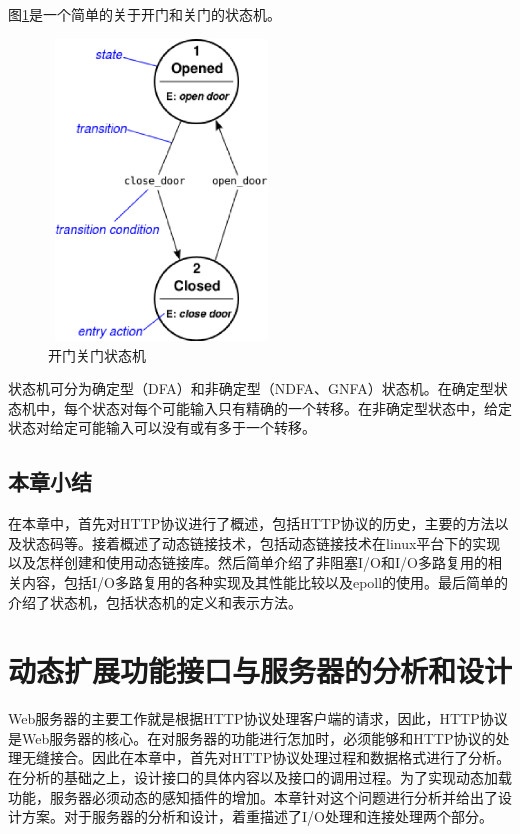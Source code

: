 \documentclass[twoside, xetex]{report}
\begin{document}
	图\ref{fsm}是一个简单的关于开门和关门的状态机。
	
	\begin{figure}[htbp]
	\centering
	\includegraphics[height=8cm, width=6cm]{pics/fsm.eps}
	\caption{开门关门状态机}
	\label{fsm}
	\end{figure}
	
	状态机可分为确定型（DFA）和非确定型（NDFA、GNFA）状态机。在确定型状态机中，每个状态对每个可能输入只有精确的一个转移。在非确定型状态中，给定状态对给定可能输入可以没有或有多于一个转移。
	
\section{本章小结}
	在本章中，首先对HTTP协议进行了概述，包括HTTP协议的历史，主要的方法以及状态码等。接着概述了动态链接技术，包括动态链接技术在linux平台下的实现以及怎样创建和使用动态链接库。然后简单介绍了非阻塞I/O和I/O多路复用的相关内容，包括I/O多路复用的各种实现及其性能比较以及epoll的使用。最后简单的介绍了状态机，包括状态机的定义和表示方法。
	
\chapter{动态扩展功能接口与服务器的分析和设计}
	
	Web服务器的主要工作就是根据HTTP协议处理客户端的请求，因此，HTTP协议是Web服务器的核心。在对服务器的功能进行怎加时，必须能够和HTTP协议的处理无缝接合。因此在本章中，首先对HTTP协议处理过程和数据格式进行了分析。在分析的基础之上，设计接口的具体内容以及接口的调用过程。为了实现动态加载功能，服务器必须动态的感知插件的增加。本章针对这个问题进行分析并给出了设计方案。对于服务器的分析和设计，着重描述了I/O处理和连接处理两个部分。
	
\end{document}
